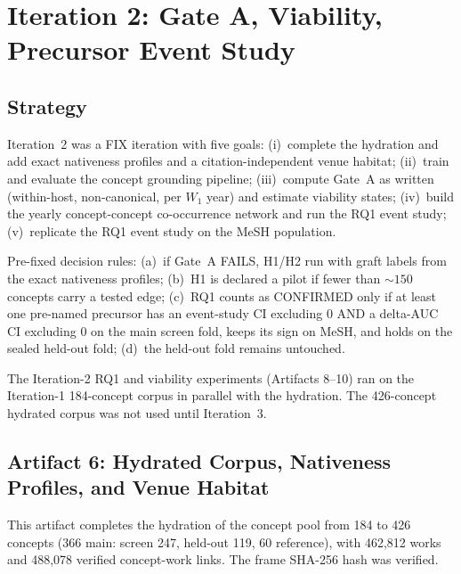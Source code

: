 \documentclass[11pt,letterpaper]{article}
\begin{document}
\section{Iteration 2: Gate A, Viability, Precursor Event Study}
\label{sec:iter2}

\subsection{Strategy}

Iteration~2 was a FIX iteration with five goals: (i)~complete the hydration and add exact nativeness profiles and a citation-independent venue habitat; (ii)~train and evaluate the concept grounding pipeline; (iii)~compute Gate~A as written (within-host, non-canonical, per $W_1$ year) and estimate viability states; (iv)~build the yearly concept-concept co-occurrence network and run the RQ1 event study; (v)~replicate the RQ1 event study on the MeSH population.

Pre-fixed decision rules: (a)~if Gate~A FAILS, H1/H2 run with graft labels from the exact nativeness profiles; (b)~H1 is declared a pilot if fewer than ${\sim}150$ concepts carry a tested edge; (c)~RQ1 counts as CONFIRMED only if at least one pre-named precursor has an event-study CI excluding 0 AND a delta-AUC CI excluding 0 on the main screen fold, keeps its sign on MeSH, and holds on the sealed held-out fold; (d)~the held-out fold remains untouched.

The Iteration-2 RQ1 and viability experiments (Artifacts 8--10) ran on the Iteration-1 184-concept corpus in parallel with the hydration. The 426-concept hydrated corpus was not used until Iteration~3.

\subsection{Artifact 6: Hydrated Corpus, Nativeness Profiles, and Venue Habitat}

This artifact completes the hydration of the concept pool from 184 to 426 concepts (366 main: screen 247, held-out 119, 60 reference), with 462,812 works and 488,078 verified concept-work links. The frame SHA-256 hash was verified.
\end{document}
